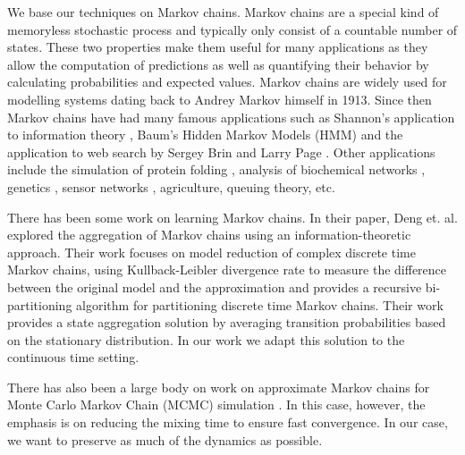 We base our techniques on  Markov chains. Markov chains are a special kind of memoryless stochastic process and typically only consist of a countable number of states. These two properties make them useful for many applications as they allow the computation of predictions as
well as quantifying their behavior by calculating probabilities and expected values. Markov chains are widely used for modelling systems dating back to Andrey Markov himself \cite{markov13} in 1913. Since then
Markov chains have had many famous applications such as Shannon's application to information theory \cite{Shannon:1948},
Baum's Hidden Markov Models (HMM) \cite{baum1970} and the application to web search by Sergey Brin and Larry Page \cite{Lawrence981}.
%
Other applications include the simulation of protein folding \cite{pande-beauchamp-bowman:2010:methods:markov-model-review},
analysis of biochemical networks \cite{Ciocchetta2009145},
genetics \cite{Huelsenbeck2310}, sensor networks \cite{DBLP:journals/corr/AlsheikhHNTL15}, agriculture, queuing theory, etc.

There has been some work on learning Markov chains. In their paper, Deng et. al. \cite{5746509} explored the aggregation of Markov chains using an information-theoretic
approach. Their work focuses on model reduction of complex discrete time Markov chains, using Kullback-Leibler divergence
rate to measure the difference between the original model and the approximation and provides a recursive bi-partitioning
algorithm for partitioning discrete time Markov chains. Their work provides a state aggregation solution by averaging
transition probabilities based on the stationary distribution. In our work we adapt this solution to the continuous time
setting.

There has also been a large body on work on approximate Markov chains for Monte Carlo Markov Chain (MCMC) simulation \cite{RSSD:RSSD117,HASTINGS01041970,10.2307/2246094,1512059}. In this case, however, the emphasis is on reducing the mixing time to ensure fast convergence. In our case, we want to preserve as much of the dynamics as possible. 



